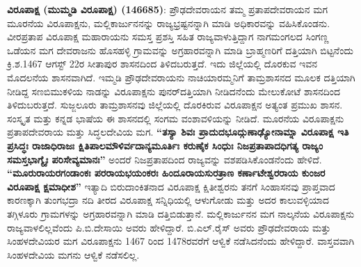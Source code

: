 \textbf{ವಿರೂಪಾಕ್ಷ (ಮುಮ್ಮಡಿ ವಿರೂಪಾಕ್ಷ) (1466\general{\enginline{-}}85)}: ಪ್ರೌಢದೇವರಾಯನ ತಮ್ಮ ಪ್ರತಾಪದೇವರಾಯನ ಮಗ ಮೂರನೆಯ ವಿರೂಪಾಕ್ಷನು, ಮಲ್ಲಿಕಾರ್ಜುನನನ್ನು ರಾಜ್ಯಭ್ರಷ್ಟನನ್ನಾಗಿ ಮಾಡಿ ಅಧಿಕಾರವನ್ನು ವಹಿಸಿಕೊಂಡನು. ವೀರಪ್ರತಾಪ ವಿರೂಪಾಕ್ಷ ಮಹಾರಾಯನು ಸಮಸ್ತ ಪ್ರಶಸ್ತಿ ಸಹಿತ ರಾಜ್ಯವಾಳುತ್ತಿದ್ದಾಗ ನಾಗಮಂಗಲದ ಸಿಂಗಣ್ಣ ಒಡೆಯನ ಮಗ ದೇವರಾಜನು ಹೊಸಹಳ್ಳಿ ಗ್ರಾಮವನ್ನು ಅಗ್ರಹಾರವನ್ನಾಗಿ ಮಾಡಿ ಬ್ರಾಹ್ಮಣರಿಗೆ ದತ್ತಿಯಾಗಿ ಬಿಟ್ಟನೆಂದು ಕ್ರಿ.ಶ.1467 ಆಗಸ್ಟ್​ 22ರ ಸೀತಾಪುರ ಶಾಸನದಿಂದ ತಿಳಿದಬರುತ್ತದೆ. ಇದು ಜಿಲ್ಲೆಯಲ್ಲಿ ದೊರಕುವ ಇವನ ಮೊದಲನೆಯ ಶಾಸನವಾಗಿದೆ. ಇಮ್ಮಡಿ ಪ್ರೌಢದೇವರಾಯನು ನಾಚಿಯಾರಮ್ಮನಿಗೆ ತಾಮ್ರಶಾಸನದ ಮೂಲಕ ದತ್ತಿಯಾಗಿ ನೀಡಿದ್ದ ಸಣಬಿಮುಕಳಿಯ ನಾಡನ್ನು ವಿರೂಪಾಕ್ಷನು ಪುನರ್​ದತ್ತಿಯಾಗಿ ನೀಡಿದನೆಂದು ಮೇಲುಕೋಟೆ ಶಾಸನದಿಂದ ತಿಳಿದುಬರುತ್ತದೆ. ಸುಜ್ಜಲೂರು ತಾಮ್ರಶಾಸನವು ಜಿಲ್ಲೆಯಲ್ಲಿ ದೊರಕಿರುವ ವಿರೂಪಾಕ್ಷನ ಅತ್ಯಂತ ಪ್ರಮುಖ ಶಾಸನ. ಸಂಸ್ಕೃತ ಮತ್ತು ಕನ್ನಡ ಭಾಷೆಯ ಈ ಶಾಸನದಲ್ಲಿ ಸಂಗಮ ವಂಶಾವಳಿಯನ್ನು ನೀಡಿದೆ. ಮೂರನೆಯ ವಿರೂಪಾಕ್ಷನು ಪ್ರತಾಪದೇವರಾಯ ಮತ್ತು ಸಿದ್ಧಲದೇವಿಯ ಮಗ. \textbf{“ತಸ್ಯಾ ಶಿವಃ ಪ್ರಾದುದಭೂದ್ಗುಣಾಢ್ಯೋನಾಮ್ನಾ ವಿರೂಪಾಕ್ಷ ಇತಿ ಪ್ರಸಿದ್ಧಃ ರಾಜಾಧಿರಾಜಃ ಕ್ಷಿತಿಪಾಲಮೌಳಿರ್ವದಾನ್ಯ\-ಮೂರ್ತಿಃ ಕರುಣೈಕ ಸಿಂಧುಃ ನಿಜಪ್ರತಾಪಾದಧಿಗತ್ಯ ರಾಜ್ಯಂ ಸಮಸ್ತಭಾಗ್ಯೈಃ ಪರಿಸೇವ್ಯಮಾನಃ”} ಅಂದರೆ ನಿಜಪ್ರತಾಪದಿಂದ ರಾಜ್ಯವನ್ನು ವಶಪಡಿಸಿಕೊಂಡನೆಂದು ಹೇಳಿದೆ. \textbf{“ಮೂರುರಾಯರಗಂಡಾಂಕಃ ಪರರಾಯಭಯಂಕರಃ ಹಿಂದೂರಾಯಸುರತ್ರಾಣ ಕರ್ಣಾಟೇಶ್ವರರಾಯ ಕುಂಜರ ವಿರೂಪಾಕ್ಷ ಕ್ಷಮಾಧೀಶ”} ಇತ್ಯಾದಿ ಬಿರುದಾಂಕಿತನಾದ ವಿರೂಪಾಕ್ಷ ಕ್ಷಿತೀಶ್ವರನು ತನಗೆ ಸಿಂಹಾಸನವು ಪ್ರಾಪ್ತವಾದ ಕಾರಣಕ್ಕಾಗಿ ತುಂಗಭದ್ರಾ ನದಿ ತೀರದ ವಿರೂಪಾಕ್ಷ ಸನ್ನಿಧಿಯಲ್ಲಿ ಆಳುಗೋಡು ಮತ್ತು ಅದರ ಕಾಲುವಳ್ಳಿಯಾದ ತಗ್ಗಿಳೂರು ಗ್ರಾಮಗಳನ್ನು ಅಗ್ರಹಾರವನ್ನಾಗಿ ಮಾಡಿ ದತ್ತಿಬಿಡುತ್ತಾನೆ. ಮಲ್ಲಿಕಾರ್ಜುನನ ಮಗ ನಾಲ್ಕನೆಯ ವಿರೂಪಾಕ್ಷನು ರಾಜ್ಯವಾಳಲಿಲ್ಲವೆಂದು ಪಿ.ಬಿ.ದೇಸಾಯಿ ಅವರು ಹೇಳಿದ್ದಾರೆ. ಬಿ.ಎಲ್​.ರೈಸ್​ ಅವರು ಪ್ರೌಢದೇವರಾಯ ಮತ್ತು ಸಿಂಹಳದೇವಿಯರ ಮಗ ವಿರೂಪಾಕ್ಷನು 1467 ರಿಂದ 1478ರವರೆಗೆ ಆಳ್ವಿಕೆ ನಡೆಸಿದನೆಂದು ಹೇಳಿದ್ದಾರೆ. ವಾಸ್ತವವಾಗಿ ಸಿಂಹಳದೇವಿಯ ಮಗನು ಆಳ್ವಿಕೆ ನಡೆಸಲಿಲ್ಲ.

\newpage

